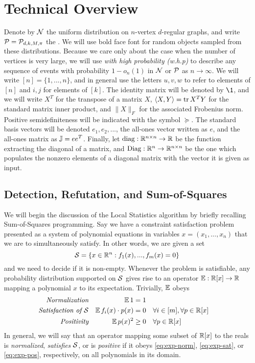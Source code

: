 \section{Technical Overview}

Denote by $\mathcal{N}$ the uniform distribution on $n$-vertex $d$-regular graphs, and write $\mathcal{P} = \mathcal{P}_{d,k,M,\pi}$ the \model. We will use bold face font for random objects sampled from these distributions. Because we care only about the case when the number of vertices is very large, we will use \emph{with high probability (w.h.p)} to describe any sequence of events with probability $1 - o_n(1)$ in $\mathcal{N}$ or $\mathcal{P}$ as $n\to \infty$. We will write $[n] = \{1,...,n\}$, and in general use the letters $u,v,w$ to refer to elements of $[n]$ and $i,j$ for elements of $[k]$. The identity matrix will be denoted by $\1$, and we will write $X^T$ for the transpose of a matrix $X$, $\langle X,Y \rangle = \operatorname{tr} X^TY$ for the standard matrix inner product, and $\|X\|_F$ for the associated Frobenius norm. Positive semidefiniteness  will be indicated with the symbol $\succeq$. The standard basis vectors will be denoted $e_1,e_2,...$, the all-ones vector written as $e$, and the all-ones matrix as $\mathbb{J} = ee^T$. Finally, let $\operatorname{diag} : \mathbb{R}^{n\times n} \to \mathbb{R}$ be the function extracting the diagonal of a matrix, and $\operatorname{Diag}: \mathbb{R}^n \to \mathbb{R}^{n\times n}$ be the one which populates the nonzero elements of a diagonal matrix with the vector it is given as input.

\subsection{Detection, Refutation, and Sum-of-Squares} %
\label{sub:detection_refutation_and_sum_of_squares}

We will begin the discussion of the Local Statistics algorithm by briefly recalling Sum-of-Squares programming. Say we have a constraint satisfaction problem presented as a system of polynomial equations in variables $x = (x_1,...,x_n)$ that we are to simultaneously satisfy. In other words, we are given a set
$$
	\mathcal{S} = \left\{ x \in \mathbb{R}^n : f_1(x),...,f_m(x) = 0\right\}
$$
and we need to decide if it is non-empty. Whenever the problem is satisfiable, any probability distribution supported on $\mathcal{S}$ gives rise to an operator $\operatorname*{\mathbb{E}}: \mathbb{R}[x] \to \mathbb{R}$ mapping a polynomial $x$ to its expectation. Trivially, $\operatorname*{\mathbb{E}}$ obeys
\begin{align}
	\textit{Normalization} & &\operatorname*{\mathbb{E}} 1 &= 1 \label{eq:exp-norm} \\
	\textit{Satisfaction of $\mathcal{S}$}& & \operatorname*{\mathbb{E}} f_i(x)\cdot p(x) &= 0 & &\forall i\in[m], \forall p \in\mathbb{R}[x] \label{eq:exp-sat}\\
	\textit{Positivity} & & \operatorname*{\mathbb{E}} p(x)^2 &\ge 0 & &\forall p \in \mathbb{R}[x] \label{eq:exp-pos} 
\end{align}
In general, we will say that an operator mapping some subset of $\mathbb{R}[x]$ to the reals is \emph{normalized}, \emph{satisfies $\mathcal{S}$}, or is \emph{positive} if it obeys \eqref{eq:exp-norm}, \eqref{eq:exp-sat}, or \eqref{eq:exp-pos}, respectively, on all polynomials in its domain.

